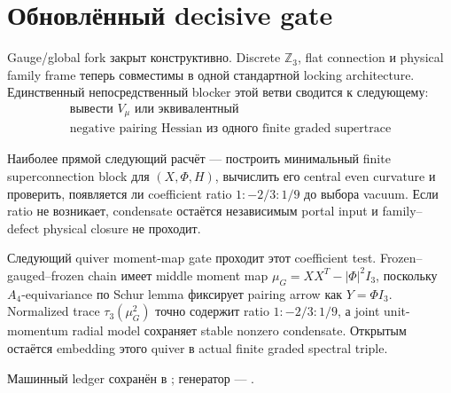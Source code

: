 \section{Обновлённый decisive gate}

Gauge/global fork закрыт конструктивно. Discrete \(\mathbb Z_3\), flat
connection и physical family frame теперь совместимы в одной стандартной
locking architecture. Единственный непосредственный blocker этой ветви
сводится к следующему:
\begin{equation}
 \boxed{
 \begin{gathered}
 \text{вывести }V_\mu\text{ или эквивалентный}\\
 \text{negative pairing Hessian из одного finite graded supertrace}
 \end{gathered}}
\end{equation}

Наиболее прямой следующий расчёт --- построить минимальный finite
superconnection block для \((X,\Phi,H)\), вычислить его central even
curvature и проверить, появляется ли coefficient ratio
\(1:-2/3:1/9\) до выбора vacuum. Если ratio не возникает, condensate
остаётся независимым portal input и family--defect physical closure не
проходит.

Следующий quiver moment-map gate проходит этот coefficient test.
Frozen--gauged--frozen chain имеет middle moment map
\(\mu_G=XX^T-|\Phi|^2I_3\), поскольку \(A_4\)-equivariance по Schur lemma
фиксирует pairing arrow как \(Y=\Phi I_3\). Normalized trace
\(\tau_3(\mu_G^2)\) точно содержит ratio \(1:-2/3:1/9\), а joint
unit-momentum radial model сохраняет stable nonzero condensate. Открытым
остаётся embedding этого quiver в actual finite graded spectral triple.

Машинный ledger сохранён в
;
генератор ---
.